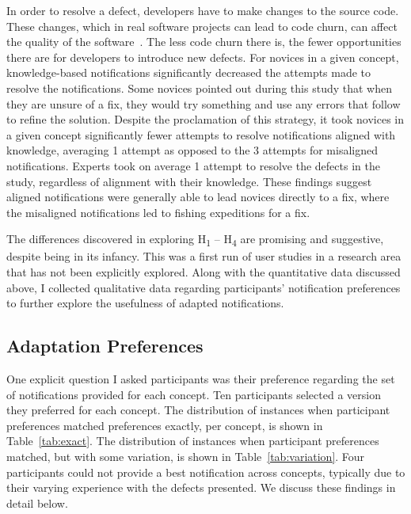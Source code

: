 In order to resolve a defect, developers have to make changes to the source code. These changes, which in real software projects can lead to code churn, can affect the quality of the software~\cite{munson1998code,nagappan2005use}. The less code churn there is, the fewer opportunities there are for developers to introduce new defects. For novices in a given concept, knowledge-based notifications significantly decreased the attempts made to resolve the notifications. Some novices pointed out during this study that when they are unsure of a fix, they would try something and use any errors that follow to refine the solution.
Despite the proclamation of this strategy, it took novices in a given concept significantly fewer attempts to resolve notifications aligned with knowledge, averaging 1 attempt as opposed to the 3 attempts for misaligned notifications.
Experts took on average 1 attempt to resolve the defects in the study, regardless of alignment with their knowledge. 
These findings suggest aligned notifications were generally able to lead novices directly to a fix, where the misaligned notifications led to fishing expeditions for a fix.

\vspace{1em}
\vspace{1em}


The differences discovered in exploring H\textsubscript{1} -- H\textsubscript{4} are promising and suggestive, despite being in its infancy. This was a first run of user studies in a research area that has not been explicitly explored. Along with the quantitative data discussed above, I collected qualitative data regarding participants' notification preferences to further explore the usefulness of adapted notifications.

\subsection{Adaptation Preferences}


One explicit question I asked participants was their preference regarding the set of notifications provided for each concept. 
Ten participants selected a version they preferred for each concept. The distribution of instances when participant preferences matched preferences exactly, per concept, is shown in Table~\ref{tab:exact}. The distribution of instances when participant preferences matched, but with some variation, is shown in Table~\ref{tab:variation}.
Four participants could not provide a best notification across concepts, typically due to their varying experience with the defects presented.
We discuss these findings in detail below.

